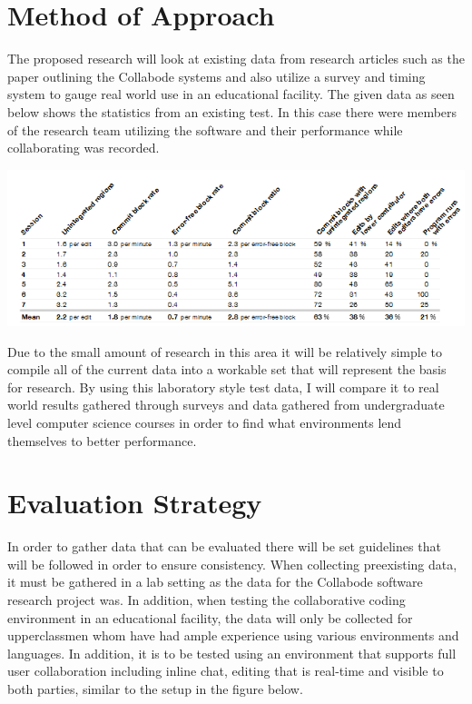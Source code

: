 \documentclass[11pt]{article}
\begin{document}
\vspace*{-.2in}
\section{Method of Approach}
\label{sec:method}
\vspace*{-.1in}

The proposed research will look at existing data from research articles such as the paper outlining the Collabode systems and also utilize a survey and timing system to gauge real world use in an educational facility. The given data as seen below shows the statistics from an existing test. In this case there were members of the research team utilizing the software and their performance while collaborating was recorded.

\includegraphics[scale=.7]{stats}

Due to the small amount of research in this area it will be relatively simple to compile all of the current data into a workable set that will represent the basis for research. By using this laboratory style test data, I will compare it to real world results gathered through surveys and data gathered from undergraduate level computer science courses in order to find what environments lend themselves to better performance.

\vspace*{-.2in}
\section{Evaluation Strategy}
\label{sec:evaluate}
\vspace*{-.1in}

In order to gather data that can be evaluated there will be set guidelines that will be followed in order to ensure consistency. When collecting preexisting data, it must be gathered in a lab setting as the data for the Collabode software research project was. In addition, when testing the collaborative coding environment in an educational facility, the data will only be collected for upperclassmen whom have had ample experience using various environments and languages. In addition, it is to be tested using an environment that supports full user collaboration including inline chat, editing that is real-time and visible to both parties, similar to the setup in the figure below.
\end{document}
